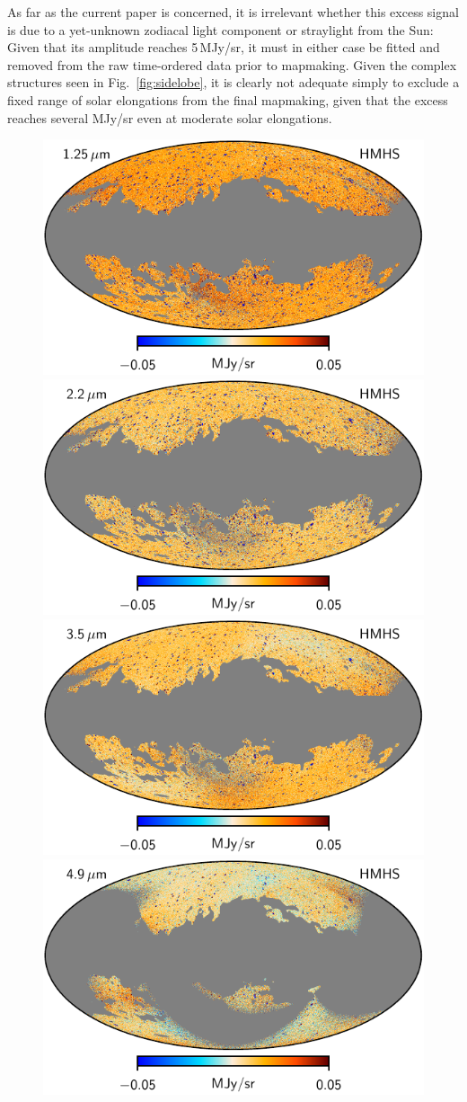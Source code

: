 \documentclass{aa}
\begin{document}
As far as the current paper is concerned, it is irrelevant whether
this excess signal is due to a yet-unknown zodiacal light component or
straylight from the Sun: Given that its amplitude reaches 5\,MJy/sr,
it must in either case be fitted and removed from the raw time-ordered
data prior to mapmaking. Given the complex structures seen in
Fig.~\ref{fig:sidelobe}, it is clearly not adequate simply to exclude
a fixed range of solar elongations from the final mapmaking, given
that the excess reaches several MJy/sr even at moderate solar
elongations.

  \begin{figure}
  \centering
  \includegraphics[width=0.42\linewidth]{figs/dirbe_01_hmhs_v1.pdf}\hspace*{5mm}
  \includegraphics[width=0.42\linewidth]{figs/dirbe_02_hmhs_v1.pdf}\\
  \includegraphics[width=0.42\linewidth]{figs/dirbe_03_hmhs_v1.pdf}\hspace*{5mm}
  \includegraphics[width=0.42\linewidth]{figs/dirbe_04_hmhs_v1.pdf}\\

\end{figure}
\end{document}
